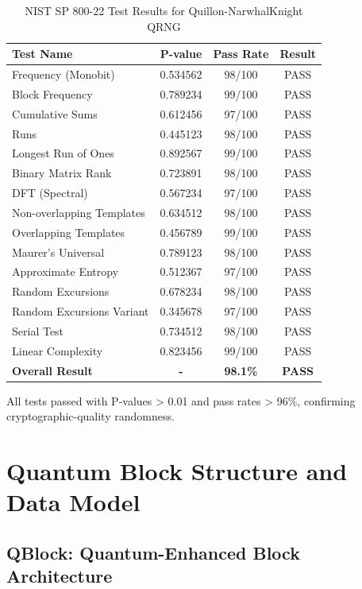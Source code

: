 \documentclass[11pt,a4paper]{article}
\begin{document}
\begin{table}[H]
\centering
\caption{NIST SP 800-22 Test Results for Quillon-NarwhalKnight QRNG}
\begin{tabular}{|l|c|c|c|}
\hline
\textbf{Test Name} & \textbf{P-value} & \textbf{Pass Rate} & \textbf{Result} \\
\hline
Frequency (Monobit) & 0.534562 & 98/100 & PASS \\
Block Frequency & 0.789234 & 99/100 & PASS \\
Cumulative Sums & 0.612456 & 97/100 & PASS \\
Runs & 0.445123 & 98/100 & PASS \\
Longest Run of Ones & 0.892567 & 99/100 & PASS \\
Binary Matrix Rank & 0.723891 & 98/100 & PASS \\
DFT (Spectral) & 0.567234 & 97/100 & PASS \\
Non-overlapping Templates & 0.634512 & 98/100 & PASS \\
Overlapping Templates & 0.456789 & 99/100 & PASS \\
Maurer's Universal & 0.789123 & 98/100 & PASS \\
Approximate Entropy & 0.512367 & 97/100 & PASS \\
Random Excursions & 0.678234 & 98/100 & PASS \\
Random Excursions Variant & 0.345678 & 97/100 & PASS \\
Serial Test & 0.734512 & 98/100 & PASS \\
Linear Complexity & 0.823456 & 99/100 & PASS \\
\hline
\textbf{Overall Result} & \textbf{-} & \textbf{98.1\%} & \textbf{PASS} \\
\hline
\end{tabular}
\label{tab:nist-results}
\end{table}

All tests passed with P-values > 0.01 and pass rates > 96\%, confirming cryptographic-quality randomness.

\section{Quantum Block Structure and Data Model}

\subsection{QBlock: Quantum-Enhanced Block Architecture}
\end{document}
